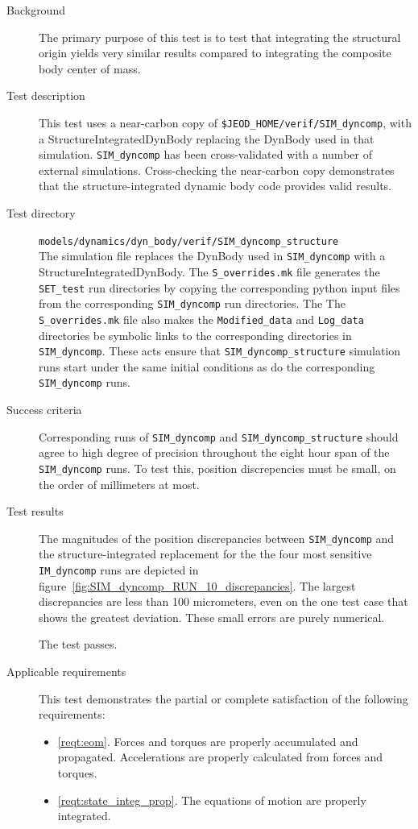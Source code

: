 \label{test:struct_integ}
\begin{description}
\item[Background] The primary purpose of this test is to test that
integrating the structural origin yields very similar results compared
to integrating the composite body center of mass.

\item[Test description]
This test uses a near-carbon copy of \verb+$JEOD_HOME/verif/SIM_dyncomp+, with
a StructureIntegratedDynBody replacing the DynBody used in that
simulation. \verb+SIM_dyncomp+ has been cross-validated with a number of
external simulations. Cross-checking the near-carbon copy demonstrates that
the structure-integrated dynamic body code provides valid results.

\item[Test directory]
{\tt models/dynamics/dyn\_body/verif/SIM\_dyncomp\_structure} \\
The simulation \Sdefine file replaces the DynBody used in
\verb+SIM_dyncomp+ with a StructureIntegratedDynBody.
The \verb+S_overrides.mk+ file generates the \verb+SET_test+ run directories
by copying the corresponding python input files from the corresponding
\verb+SIM_dyncomp+ run directories. The The \verb+S_overrides.mk+ file also
makes the \verb+Modified_data+ and \verb+Log_data+ directories be symbolic
links to the corresponding directories in \verb+SIM_dyncomp+. These acts ensure
that \verb+SIM_dyncomp_structure+ simulation runs start under the same
initial conditions as do the corresponding \verb+SIM_dyncomp+ runs.

\item[Success criteria] Corresponding runs of \verb+SIM_dyncomp+ and
\verb+SIM_dyncomp_structure+ should agree to high degree of precision
throughout the eight hour span of the \verb+SIM_dyncomp+ runs.
To test this, position discrepencies must be small, on the order of
millimeters at most.

\item[Test results] The magnitudes of the position discrepancies
between \verb+SIM_dyncomp+ and the structure-integrated replacement
for the the four most sensitive \verb+IM_dyncomp+ runs are depicted in
figure~\ref{fig:SIM_dyncomp_RUN_10_discrepancies}. The largest discrepancies
are less than 100 micrometers, even on the one test case that shows the
greatest deviation. These small errors are purely numerical.

The test passes.

\item[Applicable requirements]
This test demonstrates the partial or complete satisfaction of the
following requirements:
\begin{itemize}
\item \ref{reqt:eom}. Forces and torques are properly accumulated and
propagated. Accelerations are properly calculated from forces and torques.
\item \ref{reqt:state_integ_prop}. The equations of motion are properly
integrated.
\end{itemize}

\end{description}

